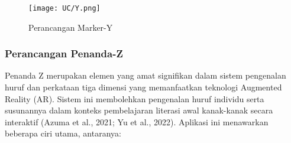 \begin{itemize}
\begin{itemize}
\begin{itemize}
\begin{itemize}
\begin{itemize}
\begin{itemize}
\begin{itemize}
\begin{itemize}
\clearpage
\begin{figure}[h]
     \centering
     \texttt{[image: UC/Y.png]}
     \caption{Perancangan Marker-Y}
     \label{fig:enterZ}
 \end{figure}
 
\clearpage

\subsubsection{Perancangan Penanda-Z}  
Penanda Z merupakan elemen yang amat signifikan dalam sistem pengenalan huruf dan perkataan tiga dimensi yang memanfaatkan teknologi Augmented Reality (AR). Sistem ini membolehkan pengenalan huruf individu serta susunannya dalam konteks pembelajaran literasi awal kanak-kanak secara interaktif (Azuma et al., 2021; Yu et al., 2022). Aplikasi ini menawarkan beberapa ciri utama, antaranya:  \\
 

\end{itemize}
\end{itemize}
\end{itemize}
\end{itemize}
\end{itemize}
\end{itemize}
\end{itemize}
\end{itemize}
